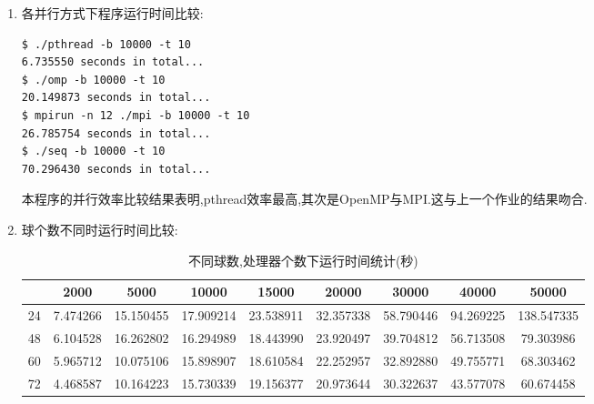 \begin{enumerate}
\item 各并行方式下程序运行时间比较:
\begin{lstlisting}
$ ./pthread -b 10000 -t 10
6.735550 seconds in total...
$ ./omp -b 10000 -t 10                                                                                                                                                                                                                         
20.149873 seconds in total...
$ mpirun -n 12 ./mpi -b 10000 -t 10
26.785754 seconds in total...
$ ./seq -b 10000 -t 10
70.296430 seconds in total...
\end{lstlisting}

本程序的并行效率比较结果表明,pthread效率最高,其次是OpenMP与MPI.这与上一个作业的结果吻合.

\item 球个数不同时运行时间比较:

	\begin{table}[h]
		\centering

		\begin{tabular}{c|c|c|c|c|c|c|c|c}
			\hline
			& 2000	    &5000       &10000      &15000	    &20000	    &30000      &40000			&50000\\\hline
			24  & 7.474266  &15.150455  &17.909214  &23.538911  &32.357338  &58.790446  &94.269225  & 138.547335 \\
			48  & 6.104528  &16.262802  &16.294989  &18.443990  &23.920497  &39.704812  &56.713508  & 79.303986  \\
			60  & 5.965712  &10.075106  &15.898907  &18.610584  &22.252957  &32.892880  &49.755771  & 68.303462  \\
			72  & 4.468587  &10.164223  &15.730339  &19.156377  &20.973644  &30.322637  &43.577078  & 60.674458  \\\hline

		\end{tabular}
		\caption{不同球数,处理器个数下运行时间统计(秒)}
	\end{table}


\end{enumerate}

